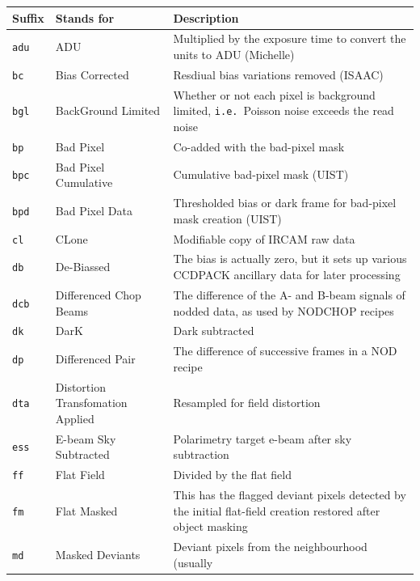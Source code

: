 \documentclass[twoside,11pt]{article}
\newcommand{\xref}[3]{#1}
\renewcommand{\_}{\texttt{\symbol{95}}}
\newcommand{\CCDPACK}{{\footnotesize CCDPACK}}
\begin{document}
\begin{tabular}{llp{90mm}}
\hline
  Suffix   & Stands for        & Description \\ \hline
{\tt\_adu} & ADU               & Multiplied by the exposure time to convert
                                 the units to ADU (Michelle) \\
{\tt\_bc}  & Bias Corrected    & Resdiual bias variations removed (ISAAC) \\
{\tt\_bgl} & BackGround Limited & Whether or not each pixel is background
                                 limited, {\tt{i.e.}}\ Poisson noise exceeds
                                 the read noise \\
{\tt\_bp}  & Bad Pixel         & Co-added with the bad-pixel mask \\
{\tt\_bpc}  & Bad Pixel Cumulative & Cumulative bad-pixel mask (UIST) \\
{\tt\_bpd}  & Bad Pixel Data   & Thresholded bias or dark frame for bad-pixel 
                                 mask creation (UIST) \\
{\tt\_cl}  & CLone             & Modifiable copy of IRCAM raw data \\
{\tt\_db}  & De-Biassed        & The bias is actually zero, but it sets
                                 up various \xref{\CCDPACK}{sun139}{}
                                 ancillary data for later processing \\
{\tt\_dcb} & Differenced Chop Beams & The difference of the A- and B-beam signals
                                      of nodded data, as used by NOD\_CHOP recipes \\
{\tt\_dk}  & DarK              & Dark subtracted \\
{\tt\_dp}  & Differenced Pair  & The difference of successive frames in a
                                 NOD recipe \\
{\tt\_dta}  & Distortion Transfomation Applied & Resampled for field distortion \\
{\tt\_ess} & E-beam Sky Subtracted & Polarimetry target e-beam after sky subtraction \\
{\tt\_ff}  & Flat Field        & Divided by the flat field \\
{\tt\_fm}  & Flat Masked       & This has the flagged deviant pixels
                                 detected by the initial flat-field creation
                                 restored after object masking \\
{\tt\_md}  & Masked Deviants   & Deviant pixels from the neighbourhood (usually

\end{tabular}
\end{document}
